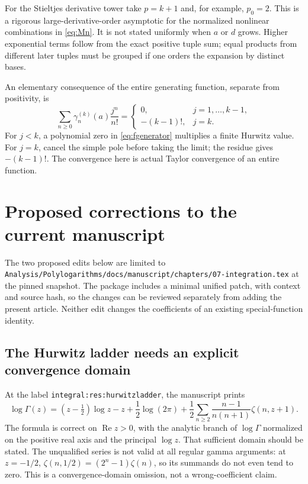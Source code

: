\documentclass[11pt]{article}
\numberwithin{equation}{section}
\theoremstyle{definition}\newtheorem{definition}[theorem]{Definition}
\theoremstyle{remark}\newtheorem{remark}[theorem]{Remark}
\DeclareMathOperator{\Rea}{Re}
\newcommand{\sourcepath}[1]{\texttt{\small\nolinkurl{#1}}}
\begin{document}
For the Stieltjes derivative tower take $p=k+1$ and, for example,
$p_0=2$. This is a rigorous large-derivative-order asymptotic for the
normalized nonlinear combinations in \eqref{eq:Mn}. It is not stated
uniformly when $a$ or $d$ grows. Higher exponential terms follow from
the exact positive tuple sum; equal products from different later tuples
must be grouped if one orders the expansion by distinct bases.

An elementary consequence of the entire generating function, separate
from positivity, is
\begin{equation}\label{eq:derivativeexpsums}
 \sum_{n\ge0}\gamma_n^{(k)}(a)\frac{j^n}{n!}
 =\begin{cases}
       0,&j=1,\ldots,k-1,\\
       -(k-1)!,&j=k.
   \end{cases}
\end{equation}
For $j<k$, a polynomial zero in \eqref{eq:fgenerator} multiplies a
finite Hurwitz value. For $j=k$, cancel the simple pole before taking
the limit; the residue gives $-(k-1)!$. The convergence here is actual
Taylor convergence of an entire function.

\section{Proposed corrections to the current manuscript}
\label{sec:corrections}

The two proposed edits below are limited to
\sourcepath{Analysis/Polylogarithms/docs/manuscript/chapters/07-integration.tex}
at the pinned snapshot. The package includes a minimal unified patch,
with context and source hash, so the changes can be reviewed separately
from adding the present article. Neither edit changes the coefficients
of an existing special-function identity.

\subsection{The Hurwitz ladder needs an explicit convergence domain}

At the label \texttt{integral:res:hurwitzladder}, the manuscript prints
\begin{equation}\label{eq:Hurwitzladder}
 \log\Gamma(z)=\left(z-\tfrac12\right)\log z-z+\frac12\log(2\pi)
 +\frac12\sum_{n\ge2}\frac{n-1}{n(n+1)}\zeta(n,z+1).
\end{equation}
The formula is correct on $\Rea z>0$, with the analytic branch of
$\log\Gamma$ normalized on the positive real axis and the principal
$\log z$. That sufficient domain should be stated. The unqualified
series is not valid at all regular gamma arguments: at $z=-1/2$,
$\zeta(n,1/2)=(2^n-1)\zeta(n)$, so its summands do not even tend to
zero. This is a convergence-domain omission, not a wrong-coefficient
claim.
\end{document}
